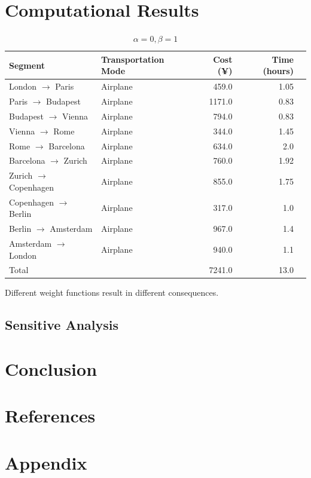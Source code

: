 \documentclass{article}
\begin{document}
\section{Computational Results}
\begin{table}[!ht]
  \centering
  \begin{tabular}{llrrr}
    \toprule
    Segment                          & Transportation Mode & Cost (¥) & Time (hours) \\
    \midrule
    London $\rightarrow$  Paris      & Airplane            & 459.0    & 1.05         \\
    Paris $\rightarrow$  Budapest    & Airplane            & 1171.0   & 0.83         \\
    Budapest $\rightarrow$  Vienna   & Airplane            & 794.0    & 0.83         \\
    Vienna $\rightarrow$  Rome       & Airplane            & 344.0    & 1.45         \\
    Rome $\rightarrow$  Barcelona    & Airplane            & 634.0    & 2.0          \\
    Barcelona $\rightarrow$  Zurich  & Airplane            & 760.0    & 1.92         \\
    Zurich $\rightarrow$  Copenhagen & Airplane            & 855.0    & 1.75         \\
    Copenhagen $\rightarrow$  Berlin & Airplane            & 317.0    & 1.0          \\
    Berlin $\rightarrow$  Amsterdam  & Airplane            & 967.0    & 1.4          \\
    Amsterdam $\rightarrow$  London  & Airplane            & 940.0    & 1.1          \\
    \midrule
    Total                            &                     & 7241.0   & 13.0         \\
    \bottomrule
  \end{tabular}
  \caption{$\alpha=0, \beta=1$}%
  \label{tab:city-travel}
\end{table}
Different weight functions result in different
consequences\cite{lamport1994latex}.
\subsection*{Sensitive Analysis}
\section{Conclusion}
\section{References}
\printbibliography[heading=none]
\appendix
\section{Appendix}
\end{document}
